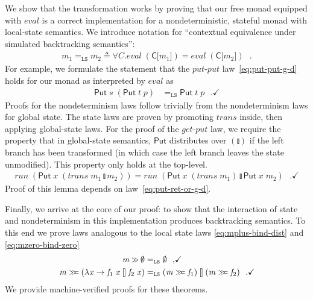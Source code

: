 \documentclass{llncs}
\newcommand{\Conid}[1]{\mathit{#1}}
\newcommand{\Varid}[1]{\mathit{#1}}
\let\Varid\mathit
\let\Conid\mathsf
\begin{document}
We show that the transformation works by proving that our free monad equipped
with \ensuremath{\Varid{eval}} is a correct
implementation for a nondeterministic, stateful monad with local-state semantics.
We introduce notation for ``contextual equivalence under simulated backtracking
semantics'':
\newcommand{\CEqLS}{=_\mathtt{LS}}
\begin{align*}
  \ensuremath{\Varid{m}_{1}} \CEqLS \ensuremath{\Varid{m}_{2}} \triangleq \forall C. \ensuremath{\Varid{eval}\;(\Conid{C}\lbrack\Varid{m}_{1}\rbrack)} = \ensuremath{\Varid{eval}\;(\Conid{C}\lbrack\Varid{m}_{2}\rbrack)} \mbox{~~.}
\end{align*}
For example, we formulate the statement that the \ensuremath{\Varid{put}}-\ensuremath{\Varid{put}}
law~\eqref{eq:put-put-g-d} holds for our monad as interpreted by \ensuremath{\Varid{eval}} as
\begin{align*}
  \ensuremath{\Conid{Put}\;\Varid{s}\;(\Conid{Put}\;\Varid{t}\;\Varid{p})} &\CEqLS \ensuremath{\Conid{Put}\;\Varid{t}\;\Varid{p}} \mbox{~~.} \checkmark
\end{align*}
Proofs for the nondeterminism laws follow trivially from the nondeterminism laws
for global state.
The state laws are proven by promoting \ensuremath{\Varid{trans}} inside, then applying
global-state laws.
For the proof of the \ensuremath{\Varid{get}}-\ensuremath{\Varid{put}} law, we require the property that in
global-state semantics, \ensuremath{\Conid{Put}} distributes over \ensuremath{(\mathbin{\talloblong})} if the left branch
has been transformed (in which case the left branch leaves the state unmodified).
This property only holds at the top-level.
\begin{align}
\ensuremath{\Varid{run}\;(\Conid{Put}\;\Varid{x}\;(\Varid{trans}\;\Varid{m}_{1}\mathbin{\talloblong}\Varid{m}_{2}))} = \ensuremath{\Varid{run}\;(\Conid{Put}\;\Varid{x}\;(\Varid{trans}\;\Varid{m}_{1})\mathbin{\talloblong}\Conid{Put}\;\Varid{x}\;\Varid{m}_{2})} \label{eq:put-ret-mplus-g}\mbox{~~.} \checkmark
\end{align}
Proof of this lemma depends on law~\eqref{eq:put-ret-or-g-d}.

Finally, we arrive at the core of our proof:
to show that the interaction of state and nondeterminism in this
implementation produces backtracking semantics.
To this end we prove laws analogous to the local state laws
\eqref{eq:mplus-bind-dist} and \eqref{eq:mzero-bind-zero}
\begin{align}
  \ensuremath{\Varid{m}\mathbin{\hstretch{0.7}{>\!\!>}}\emptyset}                      &\CEqLS \ensuremath{\emptyset} \mbox{~~,} \label{eq:mplus-bind-zero-l} \checkmark \\
  \ensuremath{\Varid{m}\mathrel{\hstretch{0.7}{>\!\!>\!\!=}}(\lambda \Varid{x}\to \Varid{f}_{1}\;\Varid{x}\mathbin{\talloblong}\Varid{f}_{2}\;\Varid{x})} &\CEqLS \ensuremath{(\Varid{m}\mathrel{\hstretch{0.7}{>\!\!>\!\!=}}\Varid{f}_{1})\mathbin{\talloblong}(\Varid{m}\mathrel{\hstretch{0.7}{>\!\!>\!\!=}}\Varid{f}_{2})} \mbox{~~.} \checkmark \label{eq:mplus-bind-dist-l}
\end{align}
We provide machine-verified proofs for these theorems.
\end{document}
